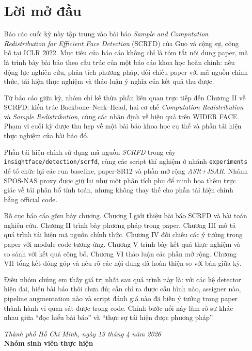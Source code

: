 ﻿\chapter*{Lời mở đầu}

Báo cáo cuối kỳ này tập trung vào bài báo \textit{Sample and Computation Redistribution for Efficient Face Detection} (SCRFD) của Guo và cộng sự, công bố tại ICLR 2022. Mục tiêu của báo cáo không chỉ là tóm tắt nội dung paper, mà là trình bày bài báo theo cấu trúc của một báo cáo khoa học hoàn chỉnh: nêu động lực nghiên cứu, phân tích phương pháp, đối chiếu paper với mã nguồn chính thức, tái hiện thực nghiệm và thảo luận ý nghĩa của kết quả thu được.

Từ báo cáo giữa kỳ, nhóm chỉ kế thừa phần liên quan trực tiếp đến Chương II về SCRFD: kiến trúc Backbone--Neck--Head, hai cơ chế \textit{Computation Redistribution} và \textit{Sample Redistribution}, cùng các nhận định về hiệu quả trên WIDER FACE. Phạm vi cuối kỳ được thu hẹp về một bài báo khoa học cụ thể và phần tái hiện thực nghiệm của bài báo đó.

Phần tái hiện chính sử dụng mã nguồn \textit{SCRFD} trong cây \texttt{insightface/detection/scrfd}, cùng các script thí nghiệm ở nhánh \texttt{experiments} để tổ chức lại các run baseline, paper-SR12 và phần mở rộng \textit{ASR+JSAR}. Nhánh SPOS-NAS proxy được giữ lại như một phân tích phụ để minh họa thêm trực giác về tái phân bổ tính toán, nhưng không thay thế cho phần tái hiện chính bằng official code.

Bố cục báo cáo gồm bảy chương. Chương I giới thiệu bài báo SCRFD và bài toán nghiên cứu. Chương II trình bày phương pháp trong paper. Chương III mô tả quá trình tái hiện mã nguồn chính thức. Chương IV đối chiếu các ý tưởng trong paper với module code tương ứng. Chương V trình bày kết quả thực nghiệm và so sánh với kết quả công bố. Chương VI thảo luận các phần mở rộng. Chương VII tổng kết đóng góp và nêu rõ các nội dung đã hoàn thiện so với bản giữa kỳ.

Điều nhóm chúng em thấy giá trị nhất sau quá trình này là: với các hệ detector hiện đại, hiểu bài báo thôi chưa đủ; cần chỉ ra được cấu hình nào, assigner nào, pipeline augmentation nào và script đánh giá nào đã biến ý tưởng trong paper thành hành vi quan sát được trong code. Chính bước nối này làm rõ sự khác nhau giữa ``đọc hiểu bài báo'' và ``thực sự tái hiện được phương pháp''.

\vspace{1.5cm}
\begin{flushright}
\textit{Thành phố Hồ Chí Minh, ngày 19 tháng 4 năm 2026}\\[0.5cm]
\textbf{Nhóm sinh viên thực hiện}
\end{flushright}

